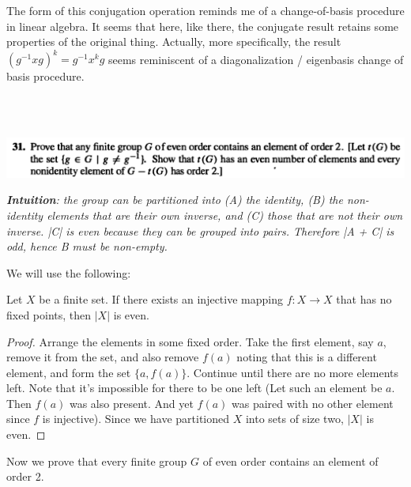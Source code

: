 \begin{remark*}
  The form of this conjugation operation reminds me of a change-of-basis procedure in linear
  algebra. It seems that here, like there, the conjugate result retains some properties of the
  original thing. Actually, more specifically, the result $(g^{-1}xg)^k = g^{-1}x^kg$ seems
  reminiscent of a diagonalization / eigenbasis change of basis procedure.
\end{remark*}


~\\~\\
\begin{mdframed}
\includegraphics[width=400pt]{img/algebra--nf--1--problem-set-1-ca16.png}
\end{mdframed}

{\it {\bf Intuition}: the group can be partitioned into (A) the identity, (B) the non-identity elements
  that are their own inverse, and (C) those that are not their own inverse. |C| is even because
  they can be grouped into pairs. Therefore |A + C| is odd, hence B must be non-empty.}


We will use the following:

\begin{lemma}
  Let $X$ be a finite set. If there exists an injective mapping $f: X \to X$ that has no fixed
  points, then $|X|$ is even.
\end{lemma}

\begin{proof}
  Arrange the elements in some fixed order. Take the first element, say $a$, remove it from the
  set, and also remove $f(a)$ noting that this is a different element, and form the
  set $\{a, f(a)\}$. Continue until there are no more elements left. Note that it's impossible for
  there to be one left (Let such an element be $a$. Then $f(a)$ was also present. And yet $f(a)$
  was paired with no other element since $f$ is injective). Since we have partitioned $X$ into sets
  of size two, $|X|$ is even.
\end{proof}

Now we prove that every finite group $G$ of even order contains an element of order 2.

